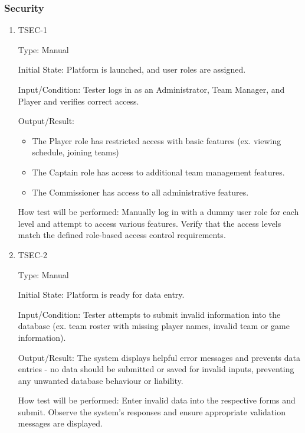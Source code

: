 \documentclass[12pt, titlepage]{article}
\begin{document}
\subsubsection{Security}

\begin{enumerate}

  \item{TSEC-1\\}

        Type: Manual

        Initial State: Platform is launched, and user roles are assigned.

        Input/Condition: Tester logs in as an Administrator, Team Manager, and Player and verifies correct access.

        Output/Result:

        \begin{itemize}
          \item{The Player role has restricted access with basic features (ex. viewing schedule, joining teams)}
          \item{The Captain role has access to additional team management features.}
          \item{The Commissioner has access to all administrative features.}

        \end{itemize}

        How test will be performed: Manually log in with a dummy user role for each level and attempt to access various features. Verify that the access levels match the defined role-based access control requirements.

  \item{TSEC-2\\}

        Type: Manual

        Initial State: Platform is ready for data entry.

        Input/Condition: Tester attempts to submit invalid information into the database (ex. team roster with missing player names, invalid team or game information).

        Output/Result: The system displays helpful error messages and prevents data entries - no data should be submitted or saved for invalid inputs, preventing any unwanted database behaviour or liability.

        How test will be performed: Enter invalid data into the respective forms and submit. Observe the system's responses and ensure appropriate validation messages are displayed.

\end{enumerate}
\end{document}
